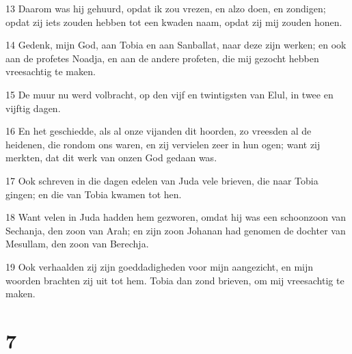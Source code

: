 \par 13 Daarom was hij gehuurd, opdat ik zou vrezen, en alzo doen, en zondigen; opdat zij iets zouden hebben tot een kwaden naam, opdat zij mij zouden honen.
\par 14 Gedenk, mijn God, aan Tobia en aan Sanballat, naar deze zijn werken; en ook aan de profetes Noadja, en aan de andere profeten, die mij gezocht hebben vreesachtig te maken.
\par 15 De muur nu werd volbracht, op den vijf en twintigsten van Elul, in twee en vijftig dagen.
\par 16 En het geschiedde, als al onze vijanden dit hoorden, zo vreesden al de heidenen, die rondom ons waren, en zij vervielen zeer in hun ogen; want zij merkten, dat dit werk van onzen God gedaan was.
\par 17 Ook schreven in die dagen edelen van Juda vele brieven, die naar Tobia gingen; en die van Tobia kwamen tot hen.
\par 18 Want velen in Juda hadden hem gezworen, omdat hij was een schoonzoon van Sechanja, den zoon van Arah; en zijn zoon Johanan had genomen de dochter van Mesullam, den zoon van Berechja.
\par 19 Ook verhaalden zij zijn goeddadigheden voor mijn aangezicht, en mijn woorden brachten zij uit tot hem. Tobia dan zond brieven, om mij vreesachtig te maken.

\chapter{7}

